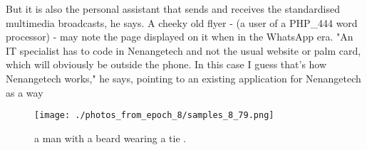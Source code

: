 \documentclass{article}%
\begin{document}
But it is also the personal assistant that sends and receives the standardised multimedia broadcasts, he says.\newline%
A cheeky old flyer {-} (a user of a PHP\_444 word processor) {-} may note the page displayed on it when in the WhatsApp era.\newline%
"An IT specialist has to code in Nenangetech and not the usual website or palm card, which will obviously be outside the phone. In this case I guess that's how Nenangetech works," he says, pointing to an existing application for Nenangetech as a way

%


\begin{figure}[h!]%
\centering%
\texttt{[image: ./photos\_from\_epoch\_8/samples\_8\_79.png]}%
\caption{a man with a beard wearing a tie .}%
\end{figure}

%
\end{document}
